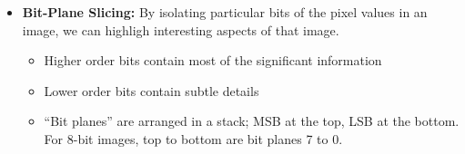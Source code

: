 \begin{itemize}
  \item \textbf{Bit-Plane Slicing:} By isolating particular bits of
    the pixel values in an image, we can highligh interesting aspects
    of that image.
    \begin{itemize}
      \item Higher order bits contain most of the significant information
      \item Lower order bits contain subtle details
      \item \enquote{Bit planes} are arranged in a stack; MSB at the
        top, LSB at the bottom. For 8-bit images, top to bottom are
        bit planes 7 to 0.
    \end{itemize}

\end{itemize}
